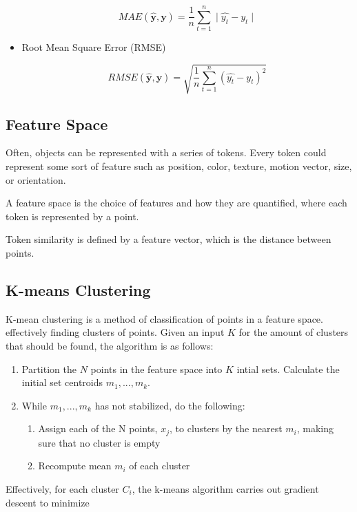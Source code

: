 \documentclass{article}
\begin{document}
\begin{multicols}{2}
\begin{itemize}
$$
MAE(\mathbf{\hat y}, \mathbf{y}) = \frac{1}{n}\sum_{t=1}^n \mid \hat{y_t} - y_t \mid
$$

\item Root Mean Square Error (RMSE)

$$
RMSE(\mathbf{\hat y}, \mathbf{y}) = \sqrt{\frac{1}{n}\sum_{t=1}^n (\hat{y_t} - y_t)^2}
$$

\end{itemize}

\subsection{Feature Space}

Often, objects can be represented with a series of tokens. Every token could represent some sort of feature such as position, color, texture, motion vector, size, or orientation.

A feature space is the choice of features and how they are quantified, where each token is represented by a point.

Token similarity is defined by a feature vector, which is the distance between points.

\subsection{K-means Clustering}

K-mean clustering is a method of classification of points in a feature space. effectively finding clusters of points. Given an input $K$ for the amount of clusters that should be found, the algorithm is as follows:

\begin{enumerate}
\item Partition the $N$ points in the feature space into $K$ intial sets. Calculate the initial set centroids $m_1, ..., m_k$.

\item While $m_1, ..., m_k$ has not stabilized, do the following:
\begin{enumerate}
\item {Assign each of the N points, $x_j$, to clusters by the nearest $m_i$, making sure that no cluster is empty}
\item {Recompute mean $m_i$ of each cluster}
\end{enumerate}
\end{enumerate}

Effectively, for each cluster $C_i$, the k-means algorithm carries out gradient descent to minimize


\end{multicols}
\end{document}
